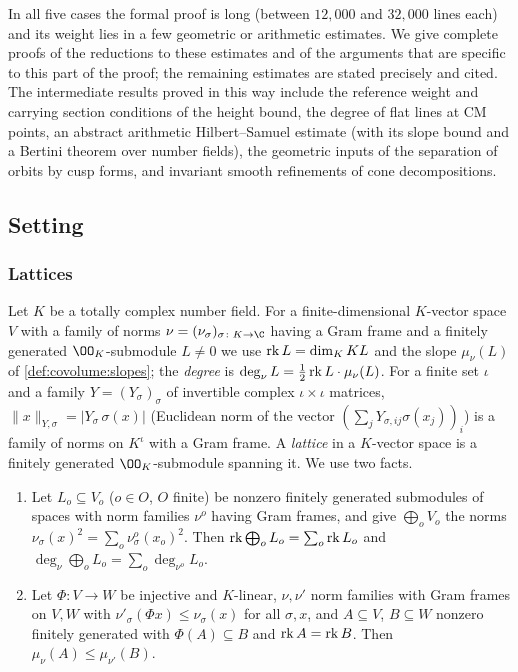 In all five cases the formal proof is long (between $12{,}000$ and $32{,}000$ lines each) and its
weight lies in a few geometric or arithmetic estimates. We give complete proofs of the reductions to
these estimates and of the arguments that are specific to this part of the proof; the remaining
estimates are stated precisely and cited. The intermediate results proved in this way include the
reference weight and carrying section conditions of the height bound, the degree of flat lines at CM
points, an abstract arithmetic Hilbert--Samuel estimate (with its slope bound and a Bertini theorem over
number fields), the geometric inputs of the separation of orbits by cusp forms, and invariant smooth
refinements of cone decompositions.

\subsection{Setting}\label{pf:lift1:setting}

\subsubsection*{Lattices}
Let $K$ be a totally complex number field. For a finite-dimensional $K$-vector space $V$ with a family
of norms $\nu=(\nu_\sigma)_{\sigma\colon K\to\C}$ having a Gram frame and a finitely generated
$\OO_K$-submodule $L\ne0$ we use $\operatorname{rk} L=\dim_K KL$ and the slope $\mu_\nu(L)$ of
\cref{def:covolume:slopes}; the \emph{degree} is $\deg_\nu L=\tfrac12\operatorname{rk} L\cdot\mu_\nu(L)$. For a
finite set $\iota$ and a family $Y=(Y_\sigma)_\sigma$ of invertible complex $\iota\times\iota$
matrices, $\|x\|_{Y,\sigma}=|Y_\sigma\,\sigma(x)|$ (Euclidean norm of the vector
$(\sum_jY_{\sigma,ij}\sigma(x_j))_i$) is a family of norms on $K^\iota$ with a Gram frame. A
\emph{lattice} in a $K$-vector space is a finitely generated $\OO_K$-submodule spanning it. We use two
facts.

\begin{lemma}\label{pf:lift1:facts}
\begin{enumerate}[label=(\alph*)]
\item Let $L_o\subseteq V_o$ ($o\in O$, $O$ finite) be nonzero finitely generated submodules of spaces
  with norm families $\nu^o$ having Gram frames, and give $\bigoplus_oV_o$ the norms
  $\nu_\sigma(x)^2=\sum_o\nu^o_\sigma(x_o)^2$. Then $\operatorname{rk}\bigoplus_oL_o=\sum_o\operatorname{rk} L_o$ and
  $\deg_\nu\bigoplus_oL_o=\sum_o\deg_{\nu^o}L_o$.
\item Let $\Phi\colon V\to W$ be injective and $K$-linear, $\nu,\nu'$ norm families with Gram frames on
  $V,W$ with $\nu'_\sigma(\Phi x)\le\nu_\sigma(x)$ for all $\sigma,x$, and $A\subseteq V$,
  $B\subseteq W$ nonzero finitely generated with $\Phi(A)\subseteq B$ and $\operatorname{rk} A=\operatorname{rk} B$.
  Then $\mu_\nu(A)\le\mu_{\nu'}(B)$.
\end{enumerate}
\end{lemma}

